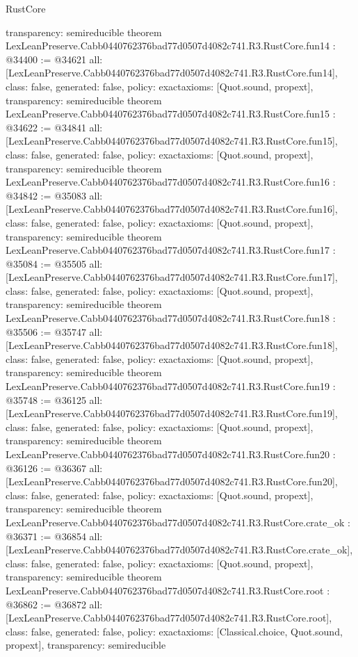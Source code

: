 \begin{lexlean}{RustCore}
\begin{coremodule}
{  transparency: semireducible
}
theorem LexLeanPreserve.Cabb0440762376bad77d0507d4082c741.R3.RustCore.fun14 : @34400 := @34621 {
  all: [LexLeanPreserve.Cabb0440762376bad77d0507d4082c741.R3.RustCore.fun14],
  class: false,
  generated: false,
  policy: exact{axioms: [Quot.sound, propext]},
  transparency: semireducible
}
theorem LexLeanPreserve.Cabb0440762376bad77d0507d4082c741.R3.RustCore.fun15 : @34622 := @34841 {
  all: [LexLeanPreserve.Cabb0440762376bad77d0507d4082c741.R3.RustCore.fun15],
  class: false,
  generated: false,
  policy: exact{axioms: [Quot.sound, propext]},
  transparency: semireducible
}
theorem LexLeanPreserve.Cabb0440762376bad77d0507d4082c741.R3.RustCore.fun16 : @34842 := @35083 {
  all: [LexLeanPreserve.Cabb0440762376bad77d0507d4082c741.R3.RustCore.fun16],
  class: false,
  generated: false,
  policy: exact{axioms: [Quot.sound, propext]},
  transparency: semireducible
}
theorem LexLeanPreserve.Cabb0440762376bad77d0507d4082c741.R3.RustCore.fun17 : @35084 := @35505 {
  all: [LexLeanPreserve.Cabb0440762376bad77d0507d4082c741.R3.RustCore.fun17],
  class: false,
  generated: false,
  policy: exact{axioms: [Quot.sound, propext]},
  transparency: semireducible
}
theorem LexLeanPreserve.Cabb0440762376bad77d0507d4082c741.R3.RustCore.fun18 : @35506 := @35747 {
  all: [LexLeanPreserve.Cabb0440762376bad77d0507d4082c741.R3.RustCore.fun18],
  class: false,
  generated: false,
  policy: exact{axioms: [Quot.sound, propext]},
  transparency: semireducible
}
theorem LexLeanPreserve.Cabb0440762376bad77d0507d4082c741.R3.RustCore.fun19 : @35748 := @36125 {
  all: [LexLeanPreserve.Cabb0440762376bad77d0507d4082c741.R3.RustCore.fun19],
  class: false,
  generated: false,
  policy: exact{axioms: [Quot.sound, propext]},
  transparency: semireducible
}
theorem LexLeanPreserve.Cabb0440762376bad77d0507d4082c741.R3.RustCore.fun20 : @36126 := @36367 {
  all: [LexLeanPreserve.Cabb0440762376bad77d0507d4082c741.R3.RustCore.fun20],
  class: false,
  generated: false,
  policy: exact{axioms: [Quot.sound, propext]},
  transparency: semireducible
}
theorem LexLeanPreserve.Cabb0440762376bad77d0507d4082c741.R3.RustCore.crate_ok : @36371 := @36854 {
  all: [LexLeanPreserve.Cabb0440762376bad77d0507d4082c741.R3.RustCore.crate_ok],
  class: false,
  generated: false,
  policy: exact{axioms: [Quot.sound, propext]},
  transparency: semireducible
}
theorem LexLeanPreserve.Cabb0440762376bad77d0507d4082c741.R3.RustCore.root : @36862 := @36872 {
  all: [LexLeanPreserve.Cabb0440762376bad77d0507d4082c741.R3.RustCore.root],
  class: false,
  generated: false,
  policy: exact{axioms: [Classical.choice, Quot.sound, propext]},
  transparency: semireducible
}


\end{coremodule}
\end{lexlean}

